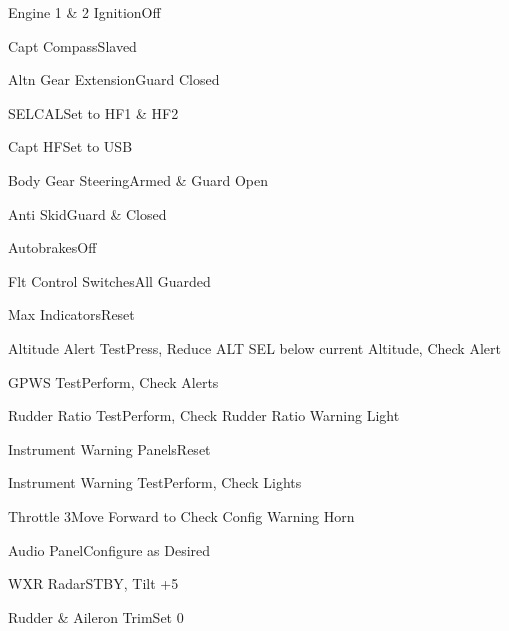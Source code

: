 \documentclass[sim-use]{checklist}
\begin{document}
\begin{continuedchecklist}
	 {
		\item{Engine 1 \& 2 Ignition}{Off}
		\item{Capt Compass}{Slaved}
		\item{Altn Gear Extension}{Guard Closed}
		\item{SELCAL}{Set to HF1 \& HF2}
		\item{Capt HF}{Set to USB}
		\item{Body Gear Steering}{Armed \& Guard Open}
		\item{Anti Skid}{Guard \& Closed}
		\item{Autobrakes}{Off}
		\item{Flt Control Switches}{All Guarded}
	}
	
	\item{Max Indicators}{Reset}
	\item{Altitude Alert Test}{Press, Reduce ALT SEL below current Altitude, Check Alert}
	\item{GPWS Test}{Perform, Check Alerts}
	\item{Rudder Ratio Test}{Perform, Check Rudder Ratio Warning Light}
	\item{Instrument Warning Panels}{Reset}
	\item{Instrument Warning Test}{Perform, Check Lights}
	\item{Throttle 3}{Move Forward to Check Config Warning Horn}
	\item{Audio Panel}{Configure as Desired}
	\item{WXR Radar}{STBY, Tilt +5}
	\item{Rudder \& Aileron Trim}{Set 0}
\end{continuedchecklist}
\end{document}
